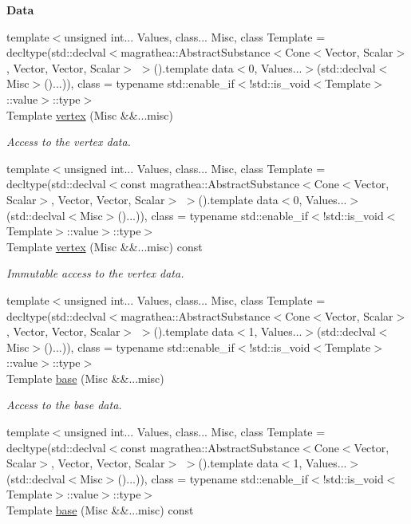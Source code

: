 \begin{Indent}{\bf Data}\par
\begin{DoxyCompactItemize}
\item 
{\footnotesize template$<$unsigned int... Values, class... Misc, class Template  = decltype(std\-::declval$<$magrathea\-::\-Abstract\-Substance$<$\-Cone$<$\-Vector, Scalar$>$, Vector, Vector, Scalar$>$ $>$().\-template data$<$0, Values...$>$(std\-::declval$<$\-Misc$>$()...)), class  = typename std\-::enable\-\_\-if$<$!std\-::is\-\_\-void$<$\-Template$>$\-::value$>$\-::type$>$ }\\Template \hyperlink{exceptionCone_a088968b50b3e59167a79fad9e1058e89}{vertex} (Misc \&\&...misc)
\begin{DoxyCompactList}\small\item\em Access to the vertex data. \end{DoxyCompactList}\item 
{\footnotesize template$<$unsigned int... Values, class... Misc, class Template  = decltype(std\-::declval$<$const magrathea\-::\-Abstract\-Substance$<$\-Cone$<$\-Vector, Scalar$>$, Vector, Vector, Scalar$>$ $>$().\-template data$<$0, Values...$>$(std\-::declval$<$\-Misc$>$()...)), class  = typename std\-::enable\-\_\-if$<$!std\-::is\-\_\-void$<$\-Template$>$\-::value$>$\-::type$>$ }\\Template \hyperlink{exceptionCone_a2c9ab423f362b7182a28aadd149eeb06}{vertex} (Misc \&\&...misc) const 
\begin{DoxyCompactList}\small\item\em Immutable access to the vertex data. \end{DoxyCompactList}\item 
{\footnotesize template$<$unsigned int... Values, class... Misc, class Template  = decltype(std\-::declval$<$magrathea\-::\-Abstract\-Substance$<$\-Cone$<$\-Vector, Scalar$>$, Vector, Vector, Scalar$>$ $>$().\-template data$<$1, Values...$>$(std\-::declval$<$\-Misc$>$()...)), class  = typename std\-::enable\-\_\-if$<$!std\-::is\-\_\-void$<$\-Template$>$\-::value$>$\-::type$>$ }\\Template \hyperlink{exceptionCone_a3d030c1eb1c35b3979a7ee738b0f38a0}{base} (Misc \&\&...misc)
\begin{DoxyCompactList}\small\item\em Access to the base data. \end{DoxyCompactList}\item 
{\footnotesize template$<$unsigned int... Values, class... Misc, class Template  = decltype(std\-::declval$<$const magrathea\-::\-Abstract\-Substance$<$\-Cone$<$\-Vector, Scalar$>$, Vector, Vector, Scalar$>$ $>$().\-template data$<$1, Values...$>$(std\-::declval$<$\-Misc$>$()...)), class  = typename std\-::enable\-\_\-if$<$!std\-::is\-\_\-void$<$\-Template$>$\-::value$>$\-::type$>$ }\\Template \hyperlink{exceptionCone_a86afa044f79b4138dd1704423cd02617}{base} (Misc \&\&...misc) const 

\end{DoxyCompactItemize}
\end{Indent}
